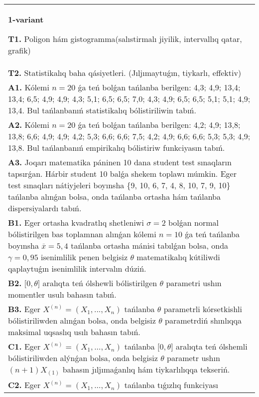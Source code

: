 \documentclass{article}
\begin{document}
\onehalfspacing
{}


\begin{tabular}{m{17cm}}
\textbf{1-variant}
\newline

\textbf{T1.} 
Poligon hám gistogramma(salıstirmalı jiyilik, intervallıq qatar, grafik)
 \\
\textbf{T2.} 
Statistikalıq baha qásiyetleri. (Jıljımaytuǵın, tiykarlı, effektiv)
 \\
\textbf{A1.} 
Kólemi \(n = 20\) ǵa teń bolǵan tańlanba berilgen: 4,3; 4,9; 13,4; 13,4; 6,5; 4,9; 4,9; 4,3; 5,1; 6,5; 6,5; 7,0; 4,3; 4,9; 6,5; 6,5; 5,1; 5,1; 4,9; 13,4. Bul tańlanbanıń statistikalıq bólistiriliwin tabıń.
 \\
\textbf{A2.} 
Kólemi \(n = 20\) ǵa teń bolǵan tańlanba berilgen: 4,2; 4,9; 13,8; 13,8; 6,6; 4,9; 4,9; 4,2; 5,3; 6,6; 6,6; 7,5; 4,2; 4,9; 6,6; 6,6; 5,3; 5,3; 4,9; 13,8. Bul tańlanbanıń empirikalıq bólistiriw funkciyasın tabıń.
 \\
\textbf{A3.} 
Joqarı matematika páninen 10 dana student test sınaqların tapsırǵan. Hárbir student 10 balǵa shekem toplawı múmkin. Eger test sınaqları nátiyjeleri boyınsha \{9, 10, 6, 7, 4, 8, 10, 7, 9, 10\} tańlanba alınǵan bolsa, onda tańlanba ortasha hám tańlanba dispersiyalardı tabıń.
 \\
\textbf{B1.} 
Eger ortasha kvadratlıq shetleniwi \(\sigma = 2\) bolǵan normal bólistirilgen bas toplamnan alınǵan kólemi \(n = 10\) ǵa teń tańlanba boyınsha \(\overline{x} = 5,4\) tańlanba ortasha mánisi tabılǵan bolsa, onda \(\gamma = 0,95\) isenimlilik penen belgisiz \(\theta\) matematikalıq kútiliwdi qaplaytuǵın isenimlilik intervalın dúziń.
 \\
\textbf{B2.} 
\(\lbrack 0,\theta\rbrack\) aralıqta teń ólshewli bólistirilgen \(\theta\) parametri ushın momentler usulı bahasın tabıń.
 \\
\textbf{B3.} 
Eger \(X^{(n)} = \left( X_{1},...,X_{n} \right)\) tańlanba \(\theta\) parametrli kórsetkishli bólistiriliwden alınǵan bolsa, onda belgisiz \(\theta\) parametrdiń shınlıqqa maksimal uqsaslıq usılı bahasın tabıń.
 \\
\textbf{C1.} 
Eger \(X^{(n)} = \left( X_{1},...,X_{n} \right)\) tańlanba \(\lbrack 0,\theta\rbrack\) aralıqta teń ólshemli bólistiriliwden alýnǵan bolsa, onda belgisiz \(\theta\) parametr ushın \((n + 1)X_{(1)}\) bahasın jıljımaǵanlıq hám tiykarlılıqqa tekseriń.
 \\
\textbf{C2.} 
Eger \(X^{(n)} = \left( X_{1},...,X_{n} \right)\) tańlanba tıǵızlıq funkciyası

\end{tabular}
\end{document}
